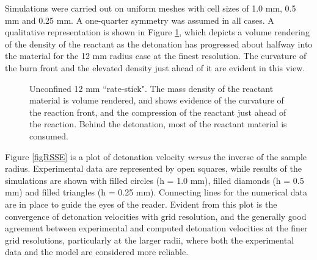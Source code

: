 Simulations were carried out on uniform meshes with cell sizes of 1.0 mm, 
0.5 mm and 0.25 mm.  A one-quarter symmetry was assumed in all cases.  A 
qualitative representation is shown in Figure \ref{figRSVR}, which depicts a 
volume rendering of the density of the reactant as the detonation has progressed
about halfway into the material for the 12 mm radius case at the finest 
resolution.  The curvature of the burn front and the elevated density just 
ahead of it are evident in this view.

\begin{figure}
  \center
  \caption{Unconfined 12 mm ``rate-stick".  The mass density of the reactant 
           material is volume rendered, and shows evidence of the curvature 
           of the reaction front, and the compression of the reactant just 
           ahead of the reaction.  Behind the detonation, most of the reactant 
           material is consumed. }
  \label{figRSVR}
\end{figure}

Figure \ref{figRSSE} is  a plot of detonation velocity {\it{versus}} the inverse of 
the sample radius.  Experimental data are represented by open squares, 
while results of the simulations are shown with filled circles (h = 1.0 mm), filled
diamonds (h = 0.5 mm) and filled triangles (h = 0.25 mm).  Connecting lines for 
the numerical data are in place to guide the eyes of the reader.  Evident 
from this plot is the convergence of detonation velocities with grid 
resolution, and the generally good agreement between experimental and
computed detonation velocities at the finer grid resolutions, particularly 
at the larger radii, where both the experimental data and the model are 
considered more reliable.

